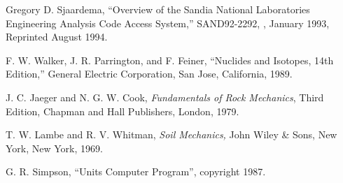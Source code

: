 \begin{thebibliography}{9}

Gregory D. Sjaardema,
``Overview of the Sandia National Laboratories Engineering Analysis Code Access System,''
SAND92-2292,
\SNLA,
January 1993, Reprinted August 1994.

F. W. Walker, J. R. Parrington, and F. Feiner, ``Nuclides and 
Isotopes, 14th Edition,'' General Electric Corporation, San Jose, California, 1989.

J. C. Jaeger and N. G. W. Cook, \textit{Fundamentals of Rock 
Mechanics}, Third Edition, Chapman and Hall Publishers, London, 1979.

T. W. Lambe and R. V. Whitman, \textit{Soil Mechanics,} John 
Wiley \& Sons, New York, New York, 1969.

G. R. Simpson, ``Units Computer Program'', copyright 1987.


\end{thebibliography}
